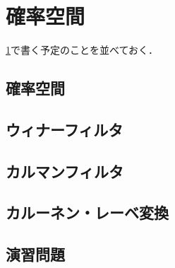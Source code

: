 \documentclass[../../main]{subfiles}
\begin{document}
\chapter{確率空間}
\label{chapter:probability_space}

\begin{lead}
  \cref{chapter:probability_space}で書く予定のことを並べておく．
\end{lead}

\section{確率空間}

\section{ウィナーフィルタ}

\section{カルマンフィルタ}

\begin{subappendices}
\section{カルーネン・レーベ変換}  
\end{subappendices}

\section*{演習問題}
\end{document}
